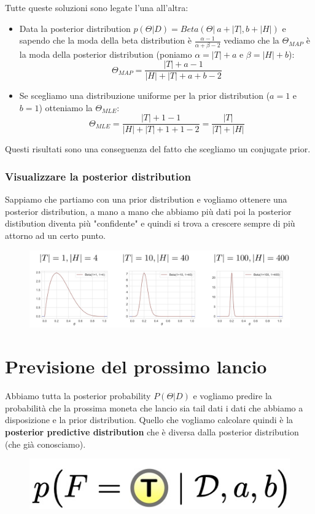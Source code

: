 \documentclass[14pt]{extreport}
\begin{document}
Tutte queste soluzioni sono legate l'una all'altra:
\begin{itemize}
	\item Data la posterior distribution $p(\Theta|D) = Beta(\Theta|\ a+|T|, b+|H|)$ e sapendo che la moda della beta distribution è $\frac{\alpha
		      -1}{\alpha + \beta - 2}$ vediamo che la $\Theta_{MAP}$ è la moda della posterior distribution (poniamo $\alpha=|T|+a$ e $\beta=|H|+b$):
	      $$\Theta_{MAP}=\frac{|T|+a-1}{|H|+|T|+a+b-2}$$
	\item Se scegliamo una distribuzione uniforme per la prior distribution ($a=1$ e $b=1$) otteniamo la $\Theta_{MLE}$:
	      $$\Theta_{MLE}=\frac{|T|+1-1}{|H|+|T|+1+1-2} = \frac{|T|}{|T|+|H|}$$
\end{itemize}
Questi risultati sono una conseguenza del fatto che scegliamo un conjugate prior.

\subsubsection{Visualizzare la posterior distribution}

Sappiamo che partiamo con una prior distribution e vogliamo ottenere una posterior distribution, a mano a mano che abbiamo più dati poi la posterior
distibution diventa più "confidente" e quindi si trova a crescere sempre di più attorno ad un certo punto.
\begin{figure}[H]
	\centering
	\includegraphics[width=0.7\linewidth]{47.jpeg}
\end{figure}


\section{Previsione del prossimo lancio}

Abbiamo tutta la posterior probability $P(\Theta | D)$ e vogliamo predire la probabilità che la prossima moneta che lancio sia tail dati i dati che
abbiamo a disposizione e la prior distribution. Quello che vogliamo calcolare quindi è la \textbf{posterior predictive distribution} che è diversa
dalla posterior distribution (che già conosciamo).

\begin{figure}[H]
	\centering
	\includegraphics[width=0.3\linewidth]{48.jpeg}
\end{figure}
\end{document}
